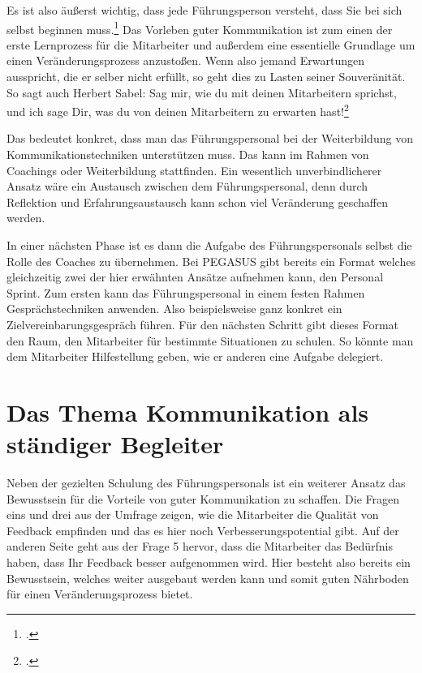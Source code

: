 \documentclass[12pt, DIV9, BCOR9mm, onecolumn, headsepline, ngerman]{scrreprt}
\begin{document}
Es ist also äußerst wichtig, dass jede Führungsperson versteht, dass Sie bei sich selbst beginnen muss.\footcite[vgl.][S.23f]{SchulzMiteinander} Das Vorleben guter Kommunikation ist zum einen der erste Lernprozess für die Mitarbeiter und außerdem eine essentielle Grundlage um einen Veränderungsprozess anzustoßen. Wenn also jemand Erwartungen ausspricht, die er selber nicht erfüllt, so geht dies zu Lasten seiner Souveränität. So sagt auch Herbert Sabel: \glqq Sag mir, wie du mit deinen Mitarbeitern sprichst, und ich sage Dir, was du von deinen Mitarbeitern zu erwarten hast!\grqq \footcite[S.24]{SabelSprechen}

Das bedeutet konkret, dass man das Führungspersonal bei der Weiterbildung von Kommunikationstechniken unterstützen muss. Das kann im Rahmen von Coachings oder Weiterbildung stattfinden. Ein wesentlich unverbindlicherer Ansatz wäre ein Austausch zwischen dem Führungspersonal, denn durch Reflektion und Erfahrungsaustausch kann schon viel Veränderung geschaffen werden.

In einer nächsten Phase ist es dann die Aufgabe des Führungspersonals selbst die Rolle des Coaches zu übernehmen. Bei PEGASUS gibt bereits ein Format welches gleichzeitig zwei der hier erwähnten Ansätze aufnehmen kann, den \glqq Personal Sprint\grqq. Zum ersten kann das Führungspersonal in einem festen Rahmen Gesprächstechniken anwenden. Also beispielsweise ganz konkret ein Zielvereinbarungsgespräch führen. Für den nächsten Schritt gibt dieses Format den Raum, den Mitarbeiter für bestimmte Situationen zu schulen. So könnte man dem Mitarbeiter Hilfestellung geben, wie er anderen eine Aufgabe delegiert.



\section{Das Thema Kommunikation als ständiger Begleiter}

Neben der gezielten Schulung des Führungspersonals ist ein weiterer Ansatz das Bewusstsein für die Vorteile von guter Kommunikation zu schaffen. Die Fragen eins und drei aus der Umfrage zeigen, wie die Mitarbeiter die Qualität von Feedback empfinden und das es hier noch Verbesserungspotential gibt. Auf der anderen Seite geht aus der Frage 5 hervor, dass die Mitarbeiter das Bedürfnis haben, dass Ihr Feedback besser aufgenommen wird. Hier besteht also bereits ein Bewusstsein, welches weiter ausgebaut werden kann und somit guten Nährboden für einen Veränderungsprozess bietet.
\end{document}
